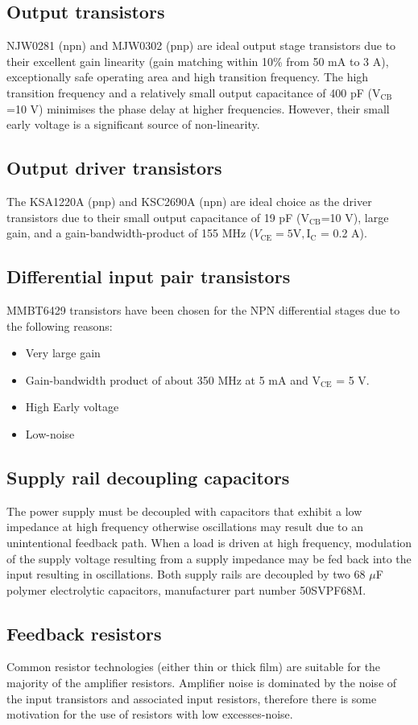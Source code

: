 \documentclass[a4paper,10pt, oneside]{article}
\begin{document}
\subsection*{Output transistors}
NJW0281 (npn) and MJW0302 (pnp) are ideal output stage transistors due to their excellent gain linearity (gain matching within 10\% from 
50 mA to 3 A), exceptionally safe operating area and high transition frequency. The high transition frequency and a relatively small 
output capacitance of 400 pF ($\textrm{V}_{\textrm{CB}}$=10 V) minimises the phase delay at higher frequencies. However, their small early voltage is a significant source of non-linearity. 
\subsection*{Output driver transistors}
The KSA1220A (pnp) and KSC2690A (npn) are ideal choice as the driver transistors due to their small output capacitance of 19 pF ($\textrm{V}_{\textrm{CB}}$=10 V), 
large gain, and a gain-bandwidth-product of 155 MHz ($V_{\textrm{CE}} = 5 \textrm{V}, \textrm{I}_{\textrm{C}}$ = 0.2 A). 
\subsection*{Differential input pair transistors}
MMBT6429 transistors have been chosen for the NPN differential stages due to the following reasons:
\begin{itemize}
 \item Very large gain
 \item Gain-bandwidth product of about 350 MHz at 5 mA and V$_{\textrm{CE}}$ = 5 V.
 \item High Early voltage
 \item Low-noise
\end{itemize}
\subsection*{Supply rail decoupling capacitors}
The power supply must be decoupled with capacitors that exhibit a low impedance at high frequency otherwise oscillations may result due to an unintentional feedback path. When a load is driven at high frequency, modulation of the supply voltage resulting from a supply impedance may 
be fed back into the input resulting in oscillations. Both supply rails are decoupled by two 68 $\mu$F polymer electrolytic capacitors, manufacturer part number 50SVPF68M.

\subsection*{Feedback resistors}
Common resistor technologies (either thin or thick film) are suitable for the majority of the amplifier resistors. Amplifier noise is 
dominated by the noise of the input transistors and associated input resistors, therefore there is some motivation for the use of resistors
with low excesses-noise.
\end{document}
